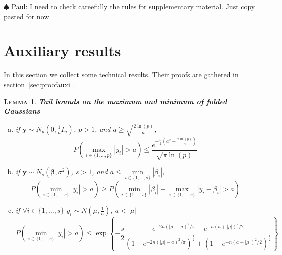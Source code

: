 \documentclass[aos]{imsart}
\theoremstyle{plain}
\newtheorem{lem}{\textsc{Lemma}}[section]
\newcommand{\paul}[1]{{\small{\color{green} \sf $\spadesuit$ Paul: #1}}}
\newcommand{\bs}{\boldsymbol}
\begin{document}
\begin{supplement}

\paul{I need to check careefully the rules for supplementary material. Just copy pasted for now}

 
 \section{Auxiliary results}\label{auxiliary}

In this section we collect some technical results. Their proofs are gathered in section~\ref{sec:proofauxi}. 

\begin{lem}\label{lemma:3tailbounds}\textbf{Tail bounds on the maximum and minimum of folded Gaussians} 
\begin{enumerate}[a)]
    \item if $\bs y\sim N_p\left(0,\frac{1}{n}I_n \right)$, $p>1$, and $a \geq \sqrt{\frac{2\ln(p)}{n}}$, $$P\left(\underset{i\in\{1,\ldots,p\}}{\max}|y_i|> a \right) \leq \frac{e^{-\frac{n}{2}\left(a^2-\frac{2\ln (p)}{n}\right)}}{\sqrt{\pi\ln (p)}}$$
    \item if $\bs y\sim N_s\left(\bs\beta,\sigma^2\right)$, $s>1$, and $a \leq \underset{i\in\{1,\ldots,s\}}{\min}|\beta_i|$,
        $$P\left(\underset{i\in\{1,\ldots,s\}}{\min}|y_i| > a\right) \geq P\left(\underset{i\in\{1,\ldots,s\}}{\min}|\beta_i|-\underset{i\in\{1,\ldots,s\}}{\max}|y_i-\beta_i| > a \right)$$
    \item if $\forall i\in\{1,\ldots,s\}$ $y_i\sim N\left(\mu,\frac{1}{n}\right)$, $a<|\mu|$
        $$P\left(\underset{i\in\{1,\ldots,s\}}{\min}|y_i| > a \right) \leq \exp\left\{-\frac{s}{2}\frac{e^{-2n(|\mu|-a)^2/\pi}-e^{-n(a+|\mu|)^2/2}}{\left(1-e^{-2n(|\mu|-a)^2/\pi}\right)^{\frac{1}{2}}+\left(1-e^{-n(a+|\mu|)^2/2}\right)^{\frac{1}{2}}}\right\} $$
\end{enumerate}
\end{lem}




\end{supplement}
\end{document}
